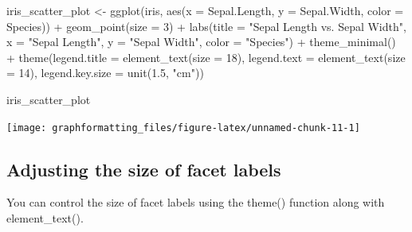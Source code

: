 \documentclass[
]{book}
\newenvironment{Shaded}{\begin{snugshade}}{\end{snugshade}}
\newcommand{\AttributeTok}[1]{\textcolor[rgb]{0.77,0.63,0.00}{#1}}
\newcommand{\DecValTok}[1]{\textcolor[rgb]{0.00,0.00,0.81}{#1}}
\newcommand{\FloatTok}[1]{\textcolor[rgb]{0.00,0.00,0.81}{#1}}
\newcommand{\FunctionTok}[1]{\textcolor[rgb]{0.00,0.00,0.00}{#1}}
\newcommand{\NormalTok}[1]{#1}
\newcommand{\OtherTok}[1]{\textcolor[rgb]{0.56,0.35,0.01}{#1}}
\newcommand{\SpecialCharTok}[1]{\textcolor[rgb]{0.00,0.00,0.00}{#1}}
\newcommand{\StringTok}[1]{\textcolor[rgb]{0.31,0.60,0.02}{#1}}
\begin{document}
\begin{Shaded}
\begin{Highlighting}[]
\NormalTok{iris\_scatter\_plot }\OtherTok{\textless{}{-}} \FunctionTok{ggplot}\NormalTok{(iris, }\FunctionTok{aes}\NormalTok{(}\AttributeTok{x =}\NormalTok{ Sepal.Length, }\AttributeTok{y =}\NormalTok{ Sepal.Width, }\AttributeTok{color =}\NormalTok{ Species)) }\SpecialCharTok{+}
  \FunctionTok{geom\_point}\NormalTok{(}\AttributeTok{size =} \DecValTok{3}\NormalTok{) }\SpecialCharTok{+}
  \FunctionTok{labs}\NormalTok{(}\AttributeTok{title =} \StringTok{"Sepal Length vs. Sepal Width"}\NormalTok{,}
       \AttributeTok{x =} \StringTok{"Sepal Length"}\NormalTok{,}
       \AttributeTok{y =} \StringTok{"Sepal Width"}\NormalTok{,}
       \AttributeTok{color =} \StringTok{"Species"}\NormalTok{) }\SpecialCharTok{+}
  \FunctionTok{theme\_minimal}\NormalTok{() }\SpecialCharTok{+}
  \FunctionTok{theme}\NormalTok{(}\AttributeTok{legend.title =} \FunctionTok{element\_text}\NormalTok{(}\AttributeTok{size =} \DecValTok{18}\NormalTok{),}
        \AttributeTok{legend.text =} \FunctionTok{element\_text}\NormalTok{(}\AttributeTok{size =} \DecValTok{14}\NormalTok{),}
        \AttributeTok{legend.key.size =} \FunctionTok{unit}\NormalTok{(}\FloatTok{1.5}\NormalTok{, }\StringTok{"cm"}\NormalTok{))}

\NormalTok{iris\_scatter\_plot}
\end{Highlighting}
\end{Shaded}

\texttt{[image: graphformatting\_files/figure-latex/unnamed-chunk-11-1]}

\hypertarget{adjusting-the-size-of-facet-labels}{%
\subsection{Adjusting the size of facet labels}\label{adjusting-the-size-of-facet-labels}}

You can control the size of facet labels using the theme() function along with element\_text().
\end{document}
